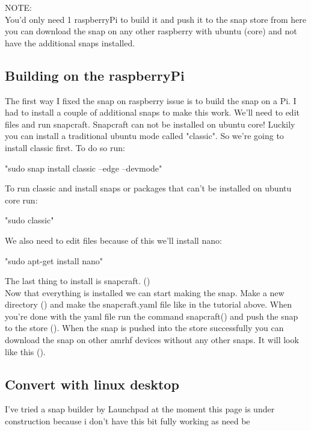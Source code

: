 \documentclass{article}
\begin{document}
\begin{flushleft}
\begin{flushleft}
NOTE: \\
You'd only need 1 raspberryPi to build it and push it to the snap store from here you can download the snap on any other raspberry with ubuntu (core) and not have the additional snaps installed.
\subsection{Building on the raspberryPi}\label{sec:rPibuild}
The first way I fixed the snap on raspberry issue is to build the snap on a Pi. I had to install a couple of additional snaps to make this work. We'll need to edit files and run snapcraft. Snapcraft can not be installed on ubuntu core! Luckily you can install a traditional ubuntu mode called "classic". So we're going to install classic first. To do so run:\\
			\begin{center}	
			"sudo snap install classic --edge --devmode"\\ 
			\end{center}
To run classic and install snaps or packages that can't be installed on ubuntu core run:\\
			\begin{center}	
			"sudo classic"\\ 
			\end{center}
			
We also need to edit files because of this we'll install nano:\\
			\begin{center}	
			"sudo apt-get install nano"\\ 
			\end{center}
The last thing to install is snapcraft. (\pageref{sec:installation})\\
Now that everything is installed we can start making the snap. Make a new directory (\pageref{sec:snap}) and make the snapcraft.yaml file like in the tutorial above. When you're done with the yaml file run the command snapcraft(\pageref{fig:step4}) and push the snap to the store (\pageref{sec:push2store}). When the snap is pushed into the store successfully  you can download the snap on other amrhf devices without any other snaps. It will look like this (\pageref{fig:snapInfo}).\\
\cleardoublepage
\subsection{Convert with linux desktop}\label{sec:linuxBuild}

I've tried a snap builder by Launchpad
at the moment this page is under construction because i don't have this bit fully working as need be
\end{flushleft}
\end{flushleft}
\end{document}
